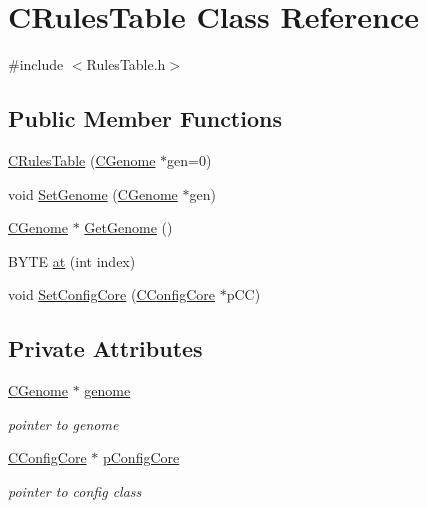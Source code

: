 \hypertarget{classCRulesTable}{
\section{CRulesTable Class Reference}
\label{classCRulesTable}
}


{\ttfamily \#include $<$RulesTable.h$>$}\subsection*{Public Member Functions}
\begin{DoxyCompactItemize}
\item 
\hyperlink{classCRulesTable_a17239390129d5e8f517046633c9f1d87}{CRulesTable} (\hyperlink{classCGenome}{CGenome} $\ast$gen=0)
\item 
void \hyperlink{classCRulesTable_a5bb7c61954a40c04ded5010accf1cdb1}{SetGenome} (\hyperlink{classCGenome}{CGenome} $\ast$gen)
\item 
\hyperlink{classCGenome}{CGenome} $\ast$ \hyperlink{classCRulesTable_a738f12d423fa1b145f50131336ac0273}{GetGenome} ()
\item 
BYTE \hyperlink{classCRulesTable_abe2bf05bb6865422c3ff9fcc24838003}{at} (int index)
\item 
void \hyperlink{classCRulesTable_a8f4653c3a4b576ce88635d60f268e6ad}{SetConfigCore} (\hyperlink{classCConfigCore}{CConfigCore} $\ast$pCC)
\end{DoxyCompactItemize}
\subsection*{Private Attributes}
\begin{DoxyCompactItemize}
\item 
\hypertarget{classCRulesTable_aed1a5800eaf53c34771e9475d399c591}{
\hyperlink{classCGenome}{CGenome} $\ast$ \hyperlink{classCRulesTable_aed1a5800eaf53c34771e9475d399c591}{genome}}
\label{classCRulesTable_aed1a5800eaf53c34771e9475d399c591}

\begin{DoxyCompactList}\small\item\em pointer to genome \item\end{DoxyCompactList}\item 
\hypertarget{classCRulesTable_aa0927df0ca0a91db95fb698876d5c360}{
\hyperlink{classCConfigCore}{CConfigCore} $\ast$ \hyperlink{classCRulesTable_aa0927df0ca0a91db95fb698876d5c360}{pConfigCore}}
\label{classCRulesTable_aa0927df0ca0a91db95fb698876d5c360}

\begin{DoxyCompactList}\small\item\em pointer to config class \item\end{DoxyCompactList}\end{DoxyCompactItemize}


